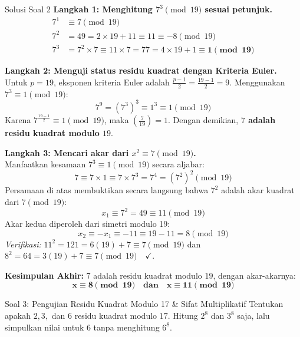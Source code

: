 \documentclass[11pt,a4paper]{article}
\begin{document}
\begin{solusibox}{Solusi Soal 2}
\textbf{Langkah 1: Menghitung $7^3 \pmod{19}$ sesuai petunjuk.}
\begin{align*}
7^1 &\equiv 7 \pmod{19} \\
7^2 &= 49 = 2 \times 19 + 11 \equiv 11 \equiv -8 \pmod{19} \\
7^3 &= 7^2 \times 7 \equiv 11 \times 7 = 77 = 4 \times 19 + 1 \equiv \mathbf{1 \pmod{19}}
\end{align*}

\textbf{Langkah 2: Menguji status residu kuadrat dengan Kriteria Euler.} \\
Untuk $p = 19$, eksponen kriteria Euler adalah $\frac{p-1}{2} = \frac{19-1}{2} = 9$. Menggunakan $7^3 \equiv 1 \pmod{19}$:
\[
7^9 = (7^3)^3 \equiv 1^3 \equiv 1 \pmod{19}
\]
Karena $7^{\frac{19-1}{2}} \equiv 1 \pmod{19}$, maka $\left(\frac{7}{19}\right) = 1$.  
Dengan demikian, \textbf{$7$ adalah residu kuadrat modulo $19$}.

\vspace{0.1cm}
\textbf{Langkah 3: Mencari akar dari $x^2 \equiv 7 \pmod{19}$.} \\
Manfaatkan kesamaan $7^3 \equiv 1 \pmod{19}$ secara aljabar:
\[
7 \equiv 7 \times 1 \equiv 7 \times 7^3 = 7^4 = (7^2)^2 \pmod{19}
\]
Persamaan di atas membuktikan secara langsung bahwa $7^2$ adalah akar kuadrat dari $7 \pmod{19}$:
\[
x_1 \equiv 7^2 = 49 \equiv 11 \pmod{19}
\]
Akar kedua diperoleh dari simetri modulo 19:
\[
x_2 \equiv -x_1 \equiv -11 \equiv 19 - 11 = 8 \pmod{19}
\]
\textit{Verifikasi:} $11^2 = 121 = 6(19) + 7 \equiv 7 \pmod{19}$ dan $8^2 = 64 = 3(19) + 7 \equiv 7 \pmod{19} \quad \checkmark$.

\vspace{0.1cm}
\textbf{Kesimpulan Akhir:} $7$ adalah residu kuadrat modulo $19$, dengan akar-akarnya:
\[
\mathbf{x \equiv 8 \pmod{19} \quad \text{dan} \quad x \equiv 11 \pmod{19}}
\]
\end{solusibox}

\vspace{0.3cm}

\begin{soalbox}{Soal 3: Pengujian Residu Kuadrat Modulo 17 \& Sifat Multiplikatif}
Tentukan apakah $2, 3,$ dan $6$ residu kuadrat modulo $17$. Hitung $2^8$ dan $3^8$ saja, lalu simpulkan nilai untuk $6$ tanpa menghitung $6^8$.
\end{soalbox}
\end{document}
